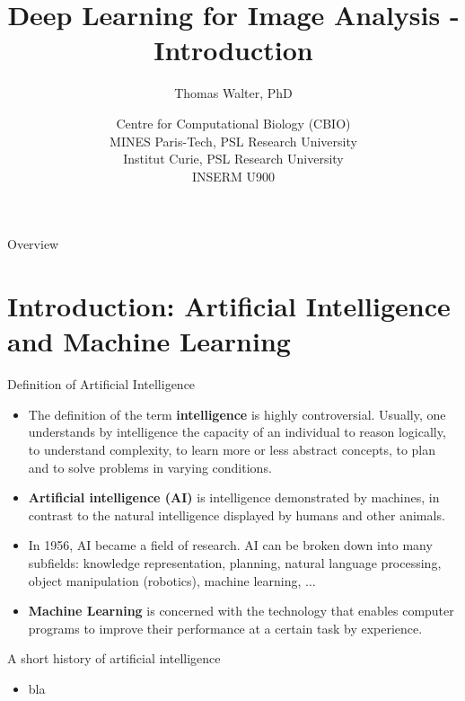 \documentclass[xcolor=pdftex,dvipsnames,table]{beamer}
\title{Deep Learning for Image Analysis - Introduction}
\author{Thomas Walter, PhD}
\date{Centre for Computational Biology (CBIO) \\
	  MINES Paris-Tech, PSL Research University \\
	  Institut Curie, PSL Research University \\
	  INSERM U900}
\begin{document}
\begin{frame}
\titlepage
\end{frame}

\begin{frame}{Overview}
\tableofcontents
\end{frame}

\section{Introduction: Artificial Intelligence and Machine Learning}

\begin{frame}{Definition of Artificial Intelligence}
\begin{itemize}
	\item The definition of the term \textbf{intelligence} is highly controversial. Usually, one understands by intelligence the capacity of an individual to reason logically, to understand complexity, to learn more or less abstract concepts, to plan and to solve problems in varying conditions. 	
	\item \textbf{Artificial intelligence (AI)} is intelligence demonstrated by machines, in contrast to the natural intelligence displayed by humans and other animals. 
	\item In 1956, AI became a field of research. AI can be broken down into many subfields: knowledge representation, planning, natural language processing, object manipulation (robotics), machine learning, $\ldots$
	\item \textbf{Machine Learning} is concerned with the technology that enables computer programs to improve their performance at a certain task by experience.
\end{itemize}
\end{frame}

\begin{frame}{A short history of artificial intelligence}
\begin{itemize}
	\item bla
\end{itemize}
\end{frame}
\end{document}
